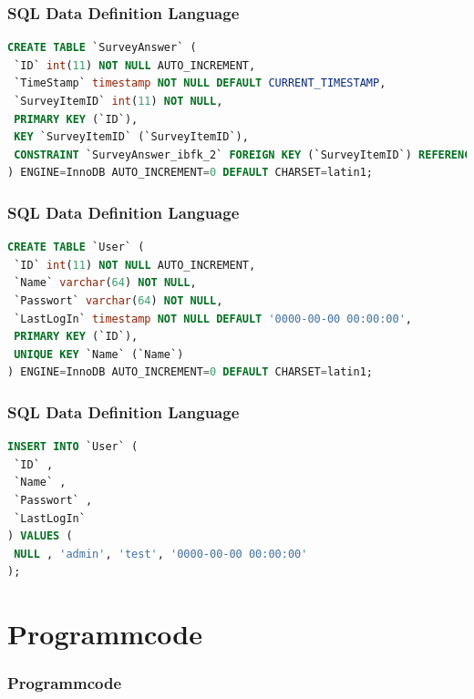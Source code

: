 \documentclass[xcolor=dvipsnames]{beamer}
\begin{document}
\begin{frame}[fragile] %
\frametitle{SQL Data Definition Language} %
\begin{lstlisting}[language=SQL, caption=SurveyAnswer]
CREATE TABLE `SurveyAnswer` (
 `ID` int(11) NOT NULL AUTO_INCREMENT,
 `TimeStamp` timestamp NOT NULL DEFAULT CURRENT_TIMESTAMP,
 `SurveyItemID` int(11) NOT NULL,
 PRIMARY KEY (`ID`),
 KEY `SurveyItemID` (`SurveyItemID`),
 CONSTRAINT `SurveyAnswer_ibfk_2` FOREIGN KEY (`SurveyItemID`) REFERENCES `SurveyItems` (`ID`) ON DELETE CASCADE ON UPDATE CASCADE
) ENGINE=InnoDB AUTO_INCREMENT=0 DEFAULT CHARSET=latin1;
\end{lstlisting} 
\end{frame}


\begin{frame}[fragile] %
\frametitle{SQL Data Definition Language} %
\begin{lstlisting}[language=SQL, caption=User]
CREATE TABLE `User` (
 `ID` int(11) NOT NULL AUTO_INCREMENT,
 `Name` varchar(64) NOT NULL,
 `Passwort` varchar(64) NOT NULL,
 `LastLogIn` timestamp NOT NULL DEFAULT '0000-00-00 00:00:00',
 PRIMARY KEY (`ID`),
 UNIQUE KEY `Name` (`Name`)
) ENGINE=InnoDB AUTO_INCREMENT=0 DEFAULT CHARSET=latin1;
\end{lstlisting} 
\end{frame}

\begin{frame}[fragile] %
\frametitle{SQL Data Definition Language} %
\begin{lstlisting}[language=SQL, caption=Benutzer anlegen]
INSERT INTO `User` (
 `ID` ,
 `Name` ,
 `Passwort` ,
 `LastLogIn`
) VALUES (
 NULL , 'admin', 'test', '0000-00-00 00:00:00'
);
\end{lstlisting} 
\end{frame}


\section{Programmcode}
\begin{frame}[shrink] %
  \frametitle{Programmcode} %

\end{frame}
\end{document}
